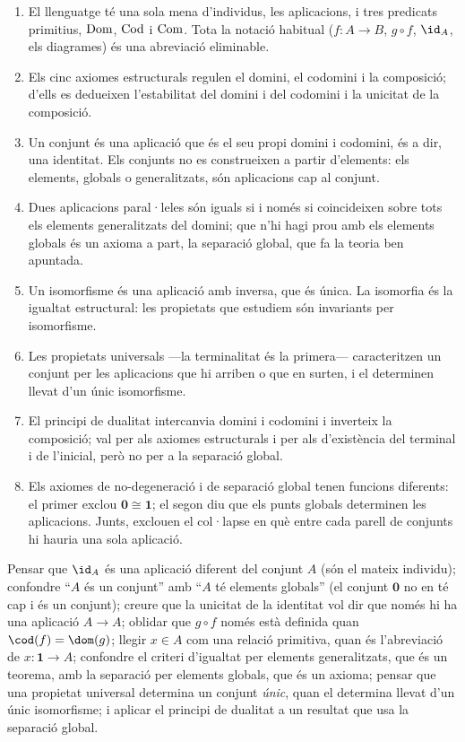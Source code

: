 \begin{resumcap}
\begin{enumerate}
  \item El llenguatge té una sola mena d'individus, les aplicacions, i tres predicats primitius, \(\operatorname{Dom}\), \(\operatorname{Cod}\) i \(\operatorname{Com}\). Tota la notació habitual (\(f\colon A\to B\), \(g\circ f\), \(\id_A\), els diagrames) és una abreviació eliminable.
  \item Els cinc axiomes estructurals regulen el domini, el codomini i la composició; d'ells es dedueixen l'estabilitat del domini i del codomini i la unicitat de la composició.
  \item Un conjunt és una aplicació que és el seu propi domini i codomini, és a dir, una identitat. Els conjunts no es construeixen a partir d'elements: els elements, globals o generalitzats, són aplicacions cap al conjunt.
  \item Dues aplicacions paral·leles són iguals si i només si coincideixen sobre tots els elements generalitzats del domini; que n'hi hagi prou amb els elements globals és un axioma a part, la separació global, que fa la teoria ben apuntada.
  \item Un isomorfisme és una aplicació amb inversa, que és única. La isomorfia és la igualtat estructural: les propietats que estudiem són invariants per isomorfisme.
  \item Les propietats universals ---la terminalitat és la primera--- caracteritzen un conjunt per les aplicacions que hi arriben o que en surten, i el determinen llevat d'un únic isomorfisme.
  \item El principi de dualitat intercanvia domini i codomini i inverteix la composició; val per als axiomes estructurals i per als d'existència del terminal i de l'inicial, però no per a la separació global.
  \item Els axiomes de no-degeneració i de separació global tenen funcions diferents: el primer exclou \(\mathbf0\cong\mathbf1\); el segon diu que els punts globals determinen les aplicacions. Junts, exclouen el col·lapse en què entre cada parell de conjunts hi hauria una sola aplicació.
\end{enumerate}
 Pensar que \(\id_A\) és una aplicació diferent del conjunt \(A\) (són el mateix individu); confondre \enquote{\(A\) és un conjunt} amb \enquote{\(A\) té elements globals} (el conjunt \(\mathbf0\) no en té cap i és un conjunt); creure que la unicitat de la identitat vol dir que només hi ha una aplicació \(A\to A\); oblidar que \(g\circ f\) només està definida quan \(\cod(f)=\dom(g)\); llegir \(x\in A\) com una relació primitiva, quan és l'abreviació de \(x\colon\mathbf1\to A\); confondre el criteri d'igualtat per elements generalitzats, que és un teorema, amb la separació per elements globals, que és un axioma; pensar que una propietat universal determina un conjunt \emph{únic}, quan el determina llevat d'un únic isomorfisme; i aplicar el principi de dualitat a un resultat que usa la separació global.

\end{resumcap}

